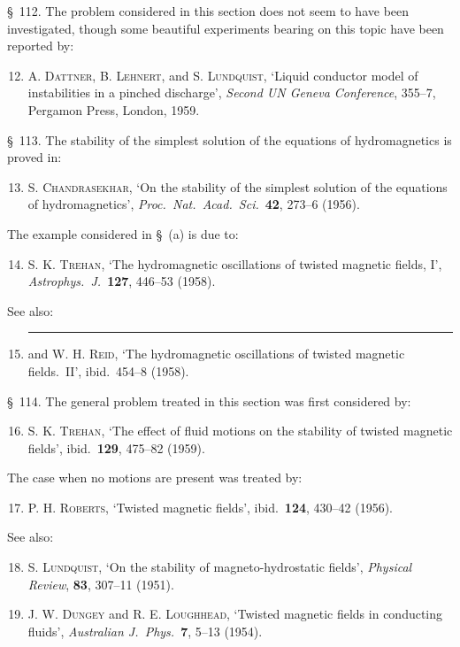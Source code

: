 \S~112. The problem considered in this section does not seem to have been investigated, though some beautiful experiments bearing on this topic have been reported by:
\begin{enumerate}
\setcounter{enumi}{11}
\item A. \textsc{Dattner}, B. \textsc{Lehnert}, and S. \textsc{Lundquist}, `Liquid conductor model of instabilities in a pinched discharge', \emph{Second UN Geneva Conference}, 355--7, Pergamon Press, London, 1959.
\end{enumerate}

\S~113. The stability of the simplest solution of the equations of hydromagnetics is proved in:
\begin{enumerate}
\setcounter{enumi}{12}
\item S. \textsc{Chandrasekhar}, `On the stability of the simplest solution of the equations of hydromagnetics', \emph{Proc.\ Nat.\ Acad.\ Sci.}\ \textbf{42}, 273--6 (1956).
\end{enumerate}
The example considered in \S~(a) is due to:
\begin{enumerate}
\setcounter{enumi}{13}
\item S. K. \textsc{Trehan}, `The hydromagnetic oscillations of twisted magnetic fields, I', \emph{Astrophys.\ J.}\ \textbf{127}, 446--53 (1958).
\end{enumerate}
See also:
\begin{enumerate}
\setcounter{enumi}{14}
\item \rule{1cm}{0.4pt} and W. H. \textsc{Reid}, `The hydromagnetic oscillations of twisted magnetic fields.\ II', ibid.\ 454--8 (1958).
\end{enumerate}

\S~114. The general problem treated in this section was first considered by:
\begin{enumerate}
\setcounter{enumi}{15}
\item S. K. \textsc{Trehan}, `The effect of fluid motions on the stability of twisted magnetic fields', ibid.\ \textbf{129}, 475--82 (1959).
\end{enumerate}
The case when no motions are present was treated by:
\begin{enumerate}
\setcounter{enumi}{16}
\item P. H. \textsc{Roberts}, `Twisted magnetic fields', ibid.\ \textbf{124}, 430--42 (1956).
\end{enumerate}
See also:
\begin{enumerate}
\setcounter{enumi}{17}
\item S. \textsc{Lundquist}, `On the stability of magneto-hydrostatic fields', \emph{Physical Review}, \textbf{83}, 307--11 (1951).

\item J. W. \textsc{Dungey} and R. E. \textsc{Loughhead}, `Twisted magnetic fields in conducting fluids', \emph{Australian J.\ Phys.}\ \textbf{7}, 5--13 (1954).
\end{enumerate}

